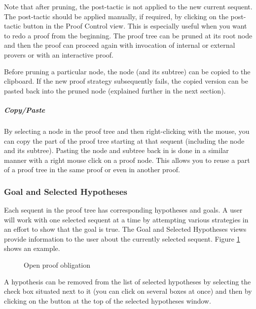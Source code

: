 Note that after pruning, the post-tactic is not applied to the new current sequent. The post-tactic should be applied manually, if required, by clicking on the post-tactic button in the Proof Control view. This is especially useful when you want to redo a proof from the beginning. The proof tree can be pruned at its root node and then the proof can proceed again with invocation of internal or external provers or with an interactive proof.

Before pruning a particular node, the node (and its subtree) can be copied to the clipboard. If the new proof strategy subsequently fails, the copied version can be pasted back into the pruned node (explained further in the next section). 

\subparagraph{Copy/Paste}

By selecting a node in the proof tree and then right-clicking with the mouse, you can copy the part of the proof tree starting at that sequent (including the node and its subtree). Pasting the node and subtree back in is done in a similar manner with a right mouse click on a proof node. This allows you to reuse a part of a proof tree in the same proof or even in another proof.

\subsubsection{Goal and Selected Hypotheses}
\label{goal_view}

Each sequent in the proof tree has corresponding hypotheses and goals. A user will work with one selected sequent at a time by attempting various strategies in an effort to show that the goal is true. The \textsf{Goal} and \textsf{Selected Hypotheses} views provide information to the user about the currently selected sequent. Figure \ref{fig_ref_01_proving_perspective3} shows an example.

\begin{figure}[!ht]
\begin{center}
	\caption{Open proof obligation}
	\label{fig_ref_01_proving_perspective3}
\end{center}
\end{figure}

A hypothesis can be removed from the list of selected hypotheses by selecting the check box situated next to it (you can click on several boxes at once) and then by clicking on the  button at the top of the selected hypotheses window.

